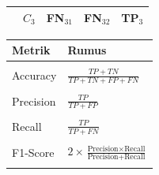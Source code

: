\begin{table}[h]
\begin{minipage}{0.5\textwidth}
\begin{tabular}{c c c c c}
            & \cellcolor{gray!20}$C_3$ & FN$_{31}$ & FN$_{32}$ & \cellcolor{green!20}TP$_{3}$ \\
            \hline
          \end{tabular}
          \subcaption{}
        \end{minipage}%
        \begin{minipage}{0.5\textwidth}
          \centering
          \begin{tabular}{l l}
          \hline
          \textbf{Metrik} & \textbf{Rumus} \\
          \hline\\
          Accuracy & $\frac{TP + TN}{TP + TN + FP + FN}$ \\
          \\
          Precision & $\frac{TP}{TP + FP}$ \\
          \\
          Recall & $\frac{TP}{TP + FN}$ \\
          \\
          F1-Score & $2 \times \frac{\text{Precision} \times \text{Recall}}{\text{Precision} +  \text{Recall}}$ \\\\
          \hline
          \end{tabular}
          \subcaption{}
        \end{minipage}
        \label{tab:confusion_matrix_and_metrics}
    \end{table}
    
